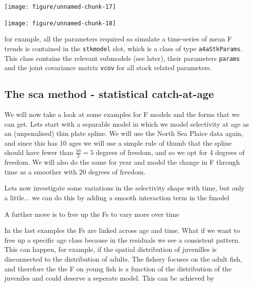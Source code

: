 \documentclass[a4paper,english,10pt]{article}\usepackage[]{graphicx}\usepackage[]{color}
\newenvironment{knitrout}{}{} %
\begin{document}
\begin{knitrout}
\color{fgcolor}

{\centering \texttt{[image: figure/unnamed-chunk-17]} 

}



\end{knitrout}


\begin{knitrout}
\color{fgcolor}

{\centering \texttt{[image: figure/unnamed-chunk-18]} 

}



\end{knitrout}


for example, all the parameters required so simulate a time-series of mean F trends is contained in the \texttt{stkmodel} slot, which is a class of type \texttt{a4aStkParams}.  This class contains the relevant submodels (see later), their parameters \texttt{params} and the joint covariance matrix \texttt{vcov} for all stock related parameters.

\subsection{The sca method - statistical catch-at-age}

We will now take a look at some examples for F models and the forms that we can get.  Lets start with a separable model in which we model selectivity at age as an (unpenalised) thin plate spline.  We will use the North Sea Plaice data again, and since this has 10 ages we will use a simple rule of thumb that the spline should have fewer than $\frac{10}{2} = 5$ degrees of freedom, and so we opt for 4 degrees of freedom.  We will also do the same for year and model the change in F through time as a smoother with 20 degrees of freedom.

Lets now investigate some variations in the selectivity shape with time, but only a little... we can do this by adding a smooth interaction term in the fmodel

A further move is to free up the Fs to vary more over time

In the last examples the Fs are linked across age and time.  What if we want to free up a specific age class because in the residuals we see a consistent pattern.  This can happen, for example, if the spatial distribution of juvenilles is disconnected to the distribution of adults.  The fishery focuses on the adult fish, and therefore the the F on young fish is a function of the distribution of the juveniles and could deserve a seperate model.  This can be achieved by
\end{document}
